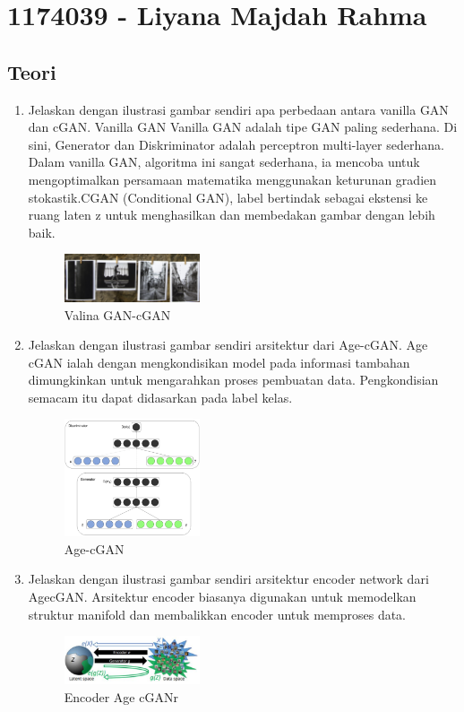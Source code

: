 \section{1174039 - Liyana Majdah Rahma}

\subsection{Teori}
\begin{enumerate}

        \item Jelaskan dengan ilustrasi gambar sendiri apa perbedaan antara vanilla GAN dan cGAN.
		Vanilla GAN Vanilla GAN adalah tipe GAN paling sederhana. Di sini, Generator dan Diskriminator adalah perceptron multi-layer sederhana. Dalam vanilla GAN, algoritma ini sangat sederhana, ia mencoba untuk mengoptimalkan persamaan matematika menggunakan keturunan gradien stokastik.CGAN (Conditional GAN), label bertindak sebagai ekstensi ke ruang laten z untuk menghasilkan dan membedakan gambar dengan lebih baik. 
			\begin{figure}[H]
            	\includegraphics[width=4cm]{figures/1174039/chapter9/teori1.PNG}
           		\centering
           		\caption{Valina GAN-cGAN}
            \end{figure}
            
        \item Jelaskan dengan ilustrasi gambar sendiri arsitektur dari Age-cGAN.
		Age cGAN ialah dengan mengkondisikan model pada informasi tambahan dimungkinkan untuk mengarahkan proses pembuatan data. Pengkondisian semacam itu dapat didasarkan pada label kelas.
			\begin{figure}[H]
				\includegraphics[width=4cm]{figures/1174039/chapter9/teori2.PNG}
            		\centering
           		\caption{Age-cGAN}
            \end{figure}
                
        \item Jelaskan dengan ilustrasi gambar sendiri arsitektur encoder network dari AgecGAN.
		Arsitektur encoder biasanya digunakan untuk memodelkan struktur manifold dan membalikkan encoder untuk memproses data.
            \begin{figure}[H]
                \includegraphics[width=4cm]{figures/1174039/chapter9/teori3.PNG}
                    \centering
                \caption{Encoder Age cGANr}
            \end{figure}


\end{enumerate}
